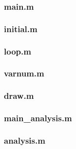 \documentclass[11pt]{scrartcl}
\begin{document}
\subsubsection{main.m}



\null
\null

\subsubsection{initial.m}



\null
\null

\subsubsection{loop.m}



\null
\null

\subsubsection{varnum.m}



\null
\null

\subsubsection{draw.m}



\null
\null

\newpage
\subsubsection{main\_analysis.m}



\null
\null

\subsubsection{analysis.m}


\end{document}
